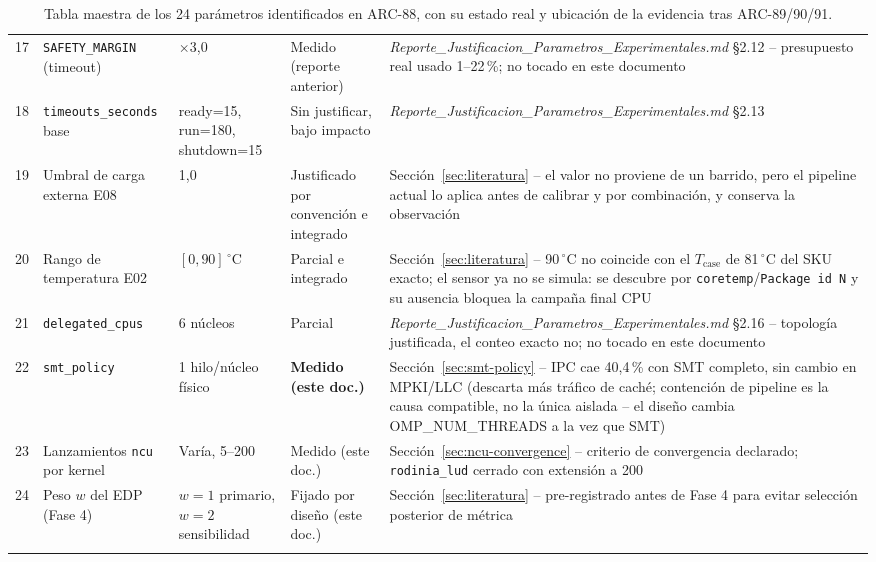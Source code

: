 \begin{longtable}{@{}p{}p{}p{}p{}p{}@{}}
17 & \texttt{SAFETY\_MARGIN} (timeout) & $\times$3{,}0 & Medido (reporte anterior) & \emph{Reporte\_Justificacion\_Parametros\_Experimentales.md} §2.12 -- presupuesto real usado 1--22\,\%; no tocado en este documento \\
18 & \texttt{timeouts\_seconds} base & ready=15, run=180, shutdown=15 & Sin justificar, bajo impacto & \emph{Reporte\_Justificacion\_Parametros\_Experimentales.md} §2.13 \\
19 & Umbral de carga externa E08 & 1{,}0 & Justificado por convención e integrado & Sección~\ref{sec:literatura} -- el valor no proviene de un barrido, pero el pipeline actual lo aplica antes de calibrar y por combinación, y conserva la observación \\
20 & Rango de temperatura E02 & $[0,90]\,^\circ$C & Parcial e integrado & Sección~\ref{sec:literatura} -- 90\,$^\circ$C no coincide con el $T_{\text{case}}$ de 81\,$^\circ$C del SKU exacto; el sensor ya no se simula: se descubre por \texttt{coretemp}/\texttt{Package id N} y su ausencia bloquea la campaña final CPU \\
21 & \texttt{delegated\_cpus} & 6 núcleos & Parcial & \emph{Reporte\_Justificacion\_Parametros\_Experimentales.md} §2.16 -- topología justificada, el conteo exacto no; no tocado en este documento \\
22 & \texttt{smt\_policy} & 1 hilo/núcleo físico & \textbf{Medido (este doc.)} & Sección~\ref{sec:smt-policy} -- IPC cae 40{,}4\,\% con SMT completo, sin cambio en MPKI/LLC (descarta más tráfico de caché; contención de pipeline es la causa compatible, no la única aislada -- el diseño cambia OMP\_NUM\_THREADS a la vez que SMT) \\
23 & Lanzamientos \texttt{ncu} por kernel & Varía, 5--200 & Medido (este doc.) & Sección~\ref{sec:ncu-convergence} -- criterio de convergencia declarado; \texttt{rodinia\_lud} cerrado con extensión a 200 \\
24 & Peso $w$ del EDP (Fase 4) & $w=1$ primario, $w=2$ sensibilidad & Fijado por diseño (este doc.) & Sección~\ref{sec:literatura} -- pre-registrado antes de Fase 4 para evitar selección posterior de métrica \\
\bottomrule
\caption{Tabla maestra de los 24 parámetros identificados en ARC-88, con su estado real y ubicación de la evidencia tras ARC-89/90/91.}
\label{tab:master}
\end{longtable}

